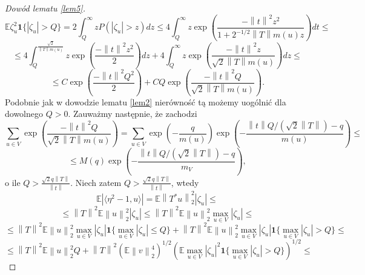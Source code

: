 \documentclass{mwart}
\newcommand{\norm}[1]{\left\lVert#1\right\rVert}
\begin{document}
\begin{proof}[Dowód lematu \ref{lem5}]
\begin{displaymath}
\mathbb{E}\zeta_u^2\pmb{1}\{|\zeta_u|>Q\}=2\int_Q^{\infty}zP\left(|\zeta_u|>z\right)dz\leq 4\int_Q^{\infty}z\exp\left(\frac{-\norm{t}^2z^2}{1+2^{-1/2}\norm{T}m(u)z}\right)dt\leq 
\end{displaymath}
\begin{displaymath}
\leq 4\int_Q^{\frac{\sqrt{2}}{\norm{T}m(u)}}z\exp \left(\frac{-\norm{t}^2z^2}{2}\right)dz+4\int_Q^{\infty}z\exp\left(\frac{-\norm{t}^2z}{\sqrt{2}\norm{T}m(u)}\right)dz\leq
\end{displaymath}
\begin{displaymath}
\leq C \exp \left(\frac{-\norm{t}^2Q^2}{2}\right)+CQ\exp\left(\frac{-\norm{t}^2Q}{\sqrt{2}\norm{T}m(u)}\right).
\end{displaymath}
Podobnie jak w dowodzie lematu \ref{lem2} nierówność tą możemy uogólnić dla dowolnego $Q>0$.
Zauważmy następnie, że zachodzi
\begin{displaymath}
\sum_{u\in V}\exp\left(\frac{-\norm{t}^2Q}{\sqrt{2}\norm{T}m(u)}\right)=\sum_{u\in V}\exp\left(-\frac{q}{m(u)}\right)\exp\left(-\frac{\norm{t}Q/(\sqrt{2}\norm{T})-q}{m(u)}\right)\leq
\end{displaymath}
\begin{displaymath}
\leq M(q)\exp\left(-\frac{\norm{t}Q/(\sqrt{2}\norm{T})-q}{m_V}\right),
\end{displaymath}
o ile $Q>\frac{\sqrt{2}q\norm{T}}{\norm{t}}$. Niech zatem $Q>\frac{\sqrt{2}q\norm{T}}{\norm{t}}$, wtedy 
\begin{displaymath}
\mathbb{E}\left| \langle \eta^2-1, u\rangle\right|=\mathbb{E}\norm{T^*u}^2_2|\zeta_u|\leq
\end{displaymath}
\begin{displaymath}
\leq \norm{T}^2\mathbb{E}\norm{u}^2_2|\zeta_u| \leq \norm{T}^2\mathbb{E}\norm{u}^2_2\max_{u\in V}|\zeta_u|\leq
\end{displaymath}
\begin{displaymath}
\leq \norm{T}^2\mathbb{E}\norm{u}^2_2\max_{u\in V}|\zeta_u|\pmb{1}\{\max_{u\in V}|\zeta_u|\leq Q\}+\norm{T}^2\mathbb{E}\norm{u}^2_2\max_{u\in V}|\zeta_u|\pmb{1}\{\max_{u\in V}|\zeta_u|> Q\}\leq
\end{displaymath}
\begin{displaymath}
\leq \norm{T}^2\mathbb{E}\norm{u}^2_2Q+\norm{T}^2\left(\mathbb{E}\norm{v}^4_2\right)^{1/2}\left(\mathbb{E}\max_{u\in V}|\zeta_u|^2\pmb{1}\{\max_{u\in V}|\zeta_u|> Q\}\right)^{1/2}\leq
\end{displaymath}
\begin{displaymath}

\end{displaymath}
\end{proof}
\end{document}
